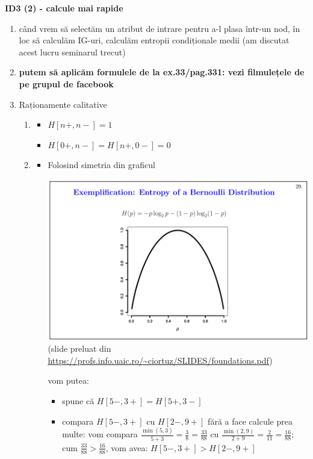 \documentclass[12pt]{article}
\begin{document}
	\textbf{\large{ID3 (2) - calcule mai rapide}}
	\begin{enumerate}
		\item când vrem să selectăm un atribut de intrare pentru a-l plasa într-un nod, în loc să calculăm IG-uri, calculăm entropii condiționale medii (am discutat acest lucru seminarul trecut)
		\item\textbf{ putem să aplicăm formulele de la ex.33/pag.331: vezi filmulețele de pe grupul de facebook}
		\item Raționamente calitative 
		\begin{enumerate}
			\item \begin{itemize}
				\item $H[n+,n-] = 1$
				\item $H[0+,n-] = H[n+,0-] = 0$
			\end{itemize}
			\item \begin{itemize}
				\item Folosind simetria din graficul \begin{center}
					\includegraphics[width=1\linewidth]{screenshot001}
					(slide preluat din \url{https://profs.info.uaic.ro/~ciortuz/SLIDES/foundations.pdf})
				\end{center}
				vom putea:
				\begin{itemize}
					\item spune că $H[5-,3+] = H[5+,3-]$
					\item compara $H[5-,3+]$ cu $H[2-,9+]$ fără a face calcule prea multe: vom compara $\frac{\min(5,3)}{5+3} = \frac{3}{8} = \frac{33}{88}$ cu $\frac{\min(2,9)}{2+9} = \frac{2}{11} = \frac{16}{88}$; cum $\frac{33}{88} > \frac{16}{88}$, vom avea: $H[5-,3+] > H[2-,9+]$

\end{itemize}
\end{itemize}
\end{enumerate}
\end{enumerate}
\end{document}
